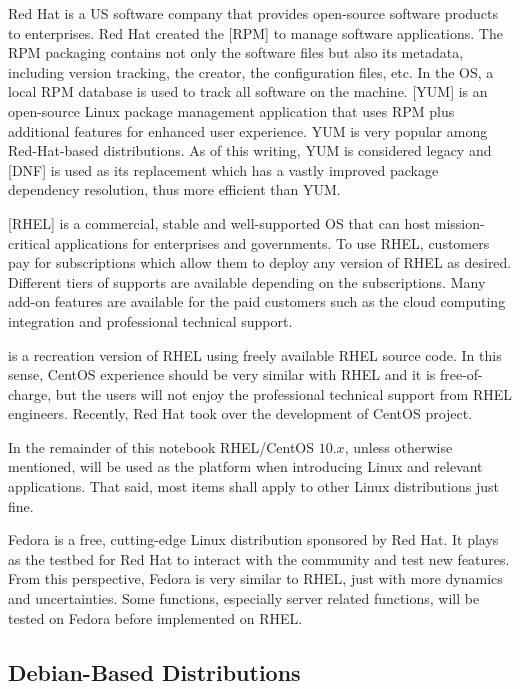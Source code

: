 Red Hat is a US software company that provides open-source software products to enterprises. Red Hat created the [RPM] to manage software applications. The RPM packaging contains not only the software files but also its metadata, including version tracking, the creator, the configuration files, etc. In the OS, a local RPM database is used to track all software on the machine. [YUM] is an open-source Linux package management application that uses RPM plus additional features for enhanced user experience. YUM is very popular among Red-Hat-based distributions. As of this writing, YUM is considered legacy and [DNF] is used as its replacement which has a vastly improved package dependency resolution, thus more efficient than YUM.

[RHEL] is a commercial, stable and well-supported OS that can host mission-critical applications for enterprises and governments. To use RHEL, customers pay for subscriptions which allow them to deploy any version of RHEL as desired. Different tiers of supports are available depending on the subscriptions. Many add-on features are available for the paid customers such as the cloud computing integration and professional technical support.

 is a recreation version of RHEL using freely available RHEL source code. In this sense, CentOS experience should be very similar with RHEL and it is free-of-charge, but the users will not enjoy the professional technical support from RHEL engineers. Recently, Red Hat took over the development of CentOS project.

In the remainder of this notebook RHEL/CentOS $10.x$, unless otherwise mentioned, will be used as the platform when introducing Linux and relevant applications. That said, most items shall apply to other Linux distributions just fine.

Fedora is a free, cutting-edge Linux distribution sponsored by Red Hat. It plays as the testbed for Red Hat to interact with the community and test new features. From this perspective, Fedora is very similar to RHEL, just with more dynamics and uncertainties. Some functions, especially server related functions, will be tested on Fedora before implemented on RHEL.

\subsection{Debian-Based Distributions}

